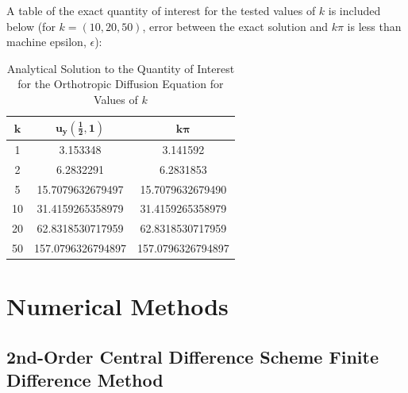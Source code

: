 \documentclass[10pt]{article}		%
\numberwithin{equation}{section}
\begin{document}
A table of the exact quantity of interest for the tested values of $k$ is included below (for $k=(10, 20, 50)$, error between the exact solution and $k\pi$ is less than machine epsilon, $\epsilon$):
\begin{table}[H]
	\caption{Analytical Solution to the Quantity of Interest for the Orthotropic Diffusion Equation for Values of $k$}
	\begin{tabular}{|c|c|c|}
		\hline 
		$\mathbf{k}$ & $\mathbf{u_y(\tfrac{1}{2},1)}$ & $\mathbf{k\pi}$ \\ 
		\hline 
		1 & 3.153348 & 3.141592 \\ 
		\hline 
		2 & 6.2832291 & 6.2831853\\ 
		\hline 
		5 & 15.7079632679497 & 15.7079632679490 \\ 
		\hline 
		10 & 31.4159265358979 & 31.4159265358979 \\ 
		\hline 
		20 & 62.8318530717959 & 62.8318530717959 \\ 
		\hline 
		50 & 157.0796326794897 & 157.0796326794897 \\ 
		\hline 
	\end{tabular}
\end{table} 

\newpage

\section{Numerical Methods}

\subsection{2nd-Order Central Difference Scheme Finite Difference Method}
\end{document}
